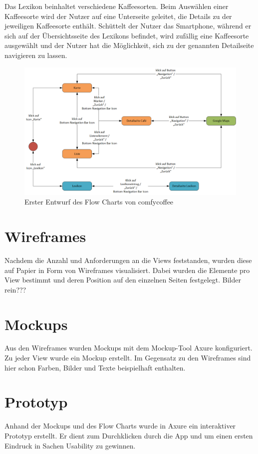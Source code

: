 Das Lexikon beinhaltet verschiedene Kaffeesorten. Beim Auswählen einer Kaffeesorte wird der Nutzer auf eine Unterseite geleitet, die Details zu der jeweiligen Kaffeesorte enthält. Schüttelt der Nutzer das Smartphone, während er sich auf der Übersichtsseite des Lexikons befindet, wird zufällig eine Kaffeesorte ausgewählt und der Nutzer hat die Möglichkeit, sich zu der genannten Detailseite navigieren zu lassen.

\begin{figure}[H]
    \centering
		\includegraphics[width=\textwidth]{Bilder/flowchart.png}
		\caption{Erster Entwurf des Flow Charts von comfycoffee}
\end{figure}

\section{Wireframes}
Nachdem die Anzahl und Anforderungen an die Views feststanden, wurden diese auf Papier in Form von Wireframes visualisiert. Dabei wurden die Elemente pro View bestimmt und deren Position auf den einzelnen Seiten festgelegt.
Bilder rein???

\section{Mockups}
Aus den Wireframes wurden Mockups mit dem Mockup-Tool Axure konfiguriert. Zu jeder View wurde ein Mockup erstellt. Im Gegensatz zu den Wireframes sind hier schon Farben, Bilder und Texte beispielhaft enthalten.

\section{Prototyp}
Anhand der Mockups und des Flow Charts wurde in Axure ein interaktiver Prototyp erstellt. Er dient zum Durchklicken durch die App und um einen ersten Eindruck in Sachen Usability zu gewinnen.

